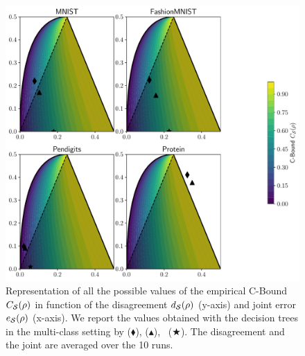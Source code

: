\begin{noaddcontents}
\begin{figure}
    \centering
    \includegraphics[width=1.0\linewidth]{chapter_4/figures/cbound_tree_multi_1.pdf}
    \caption{
    Representation of all the possible values of the empirical C-Bound ${C}_{\mathcal{S}}(\rho)$ in function of the disagreement $d_{\mathcal{S}}(\rho)$ (y-axis) and joint error $e_{\mathcal{S}}(\rho)$ (x-axis).
We report the values obtained with the decision trees in the multi-class setting by  ($\blacklozenge$), \algomasegosa ($\blacktriangle$), \algogermain~($\bigstar$).
The disagreement and the joint are averaged over the 10 runs.
    }
    \label{chap:mv:fig:cbound-tree-multi-1}
\end{figure}


\end{noaddcontents}
